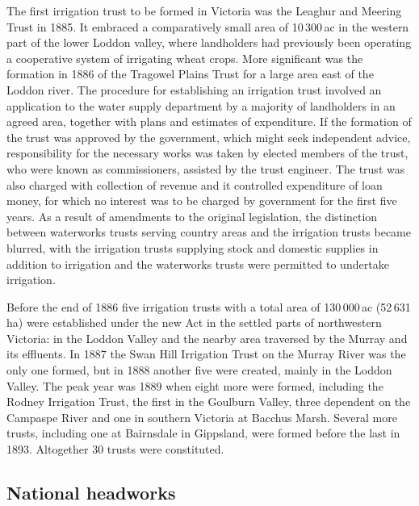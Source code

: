 The first irrigation trust to be formed in Victoria was the Leaghur
and Meering Trust in 1885.  It embraced a comparatively small area of
10\,300\,ac in the western part of the lower Loddon valley, where
landholders had previously been operating a cooperative system of
irrigating wheat crops.  More significant was the formation in 1886 of
the Tragowel Plains Trust for a large area east of the Loddon river.
The procedure for establishing an irrigation trust involved an
application to the water supply department by a majority of
landholders in an agreed area, together with plans and estimates of
expenditure.  If the formation of the trust was approved by the
government, which might seek independent advice, responsibility for
the necessary works was taken by elected members of the trust, who
were known as commissioners, assisted by the trust engineer.  The
trust was also charged with collection of revenue and it controlled
expenditure of loan money, for which no interest was to be charged by
government for the first five years.  As a result of amendments to the
original legislation, the distinction between waterworks trusts
serving country areas and the irrigation trusts became blurred, with
the irrigation trusts supplying stock and domestic supplies in
addition to irrigation and the waterworks trusts were permitted to
undertake irrigation.

Before the end of 1886 five irrigation trusts with a total area of
130\,000\,ac (52\,631\,ha) were established under the new Act in the
settled parts of northwestern Victoria: in the Loddon Valley and the
nearby area traversed by the Murray and its effluents.  In 1887 the
Swan Hill Irrigation Trust on the Murray River was the only one
formed, but in 1888 another five were created, mainly in the Loddon
Valley.  The peak year was 1889 when eight more were formed, including
the Rodney Irrigation Trust, the first in the Goulburn Valley, three
dependent on the Campaspe River and one in southern Victoria at
Bacchus Marsh.  Several more trusts, including one at Bairnsdale in
Gippsland, were formed before the last in 1893.  Altogether 30 trusts
were constituted.

\subsection*{National headworks}

